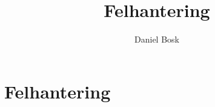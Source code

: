 \documentclass[a4paper,10pt,oneside,openright,
               oldfontcommands]{memoir}
\begin{document}
\title{%
  Felhantering
}
\author{Daniel Bosk}

\maketitle

\begin{abstract}
  
\end{abstract}

\clearpage

\tableofcontents*

\chapter{Felhantering}



\appendix


\printbibliography
\end{document}
